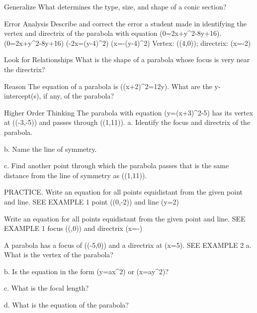 \documentclass{article}
\newenvironment{practice}[2]{}{}        %
\newcommand{\answer}[1]{}               %
\newcommand{\te}[1]{}                   %
\begin{document}
\begin{practice}{11}{2}
Generalize What determines the type, size, and shape of a conic section?
\answer{the way in which the plane intersects the double-right cone}
\end{practice}
\begin{practice}{12}{2}
Error Analysis Describe and correct the error a student made in identifying the vertex and directrix of the parabola with equation (0=2x+y^2-8y+16).
(0=2x+y^2-8y+16)
(-2x=(y-4)^2)
(x=-(y-4)^2)
Vertex: ((4,0)); directrix: (x=-2)
\te{The student's work is marked with a red X.}
\answer{The student wrote a correct equation, but interpreted it incorrectly. The vertex is ((0,4)), not ((4,0)), and since the parabola opens left and (c=-\frac{1}{2}), the directrix is (x=\frac{1}{2}), not (x=-2).}
\end{practice}
\begin{practice}{13}{2}
Look for Relationships What is the shape of a parabola whose focus is very near the directrix?
\answer{The parabola will appear very long and narrow.}
\end{practice}
\begin{practice}{14}{2}
Reason The equation of a parabola is ((x+2)^2=12y). What are the y-intercept(s), if any, of the parabola?
\answer{The y-intercept is ((0,\frac{1}{3})).}
\end{practice}
\begin{practice}{15}{3}
Higher Order Thinking The parabola with equation (y=(x+3)^2-5) has its vertex at ((-3,-5)) and passes through ((1,11)).
a. Identify the focus and directrix of the parabola.
\answer{focus: ((-3,-4.75)); directrix: (y=-5.25)}
b. Name the line of symmetry.
\answer{(x=-3)}
c. Find another point through which the parabola passes that is the same distance from the line of symmetry as ((1,11)).
\answer{((-7,11))}
\end{practice}
\begin{practice}{16}{1}
PRACTICE. Write an equation for all points equidistant from the given point and line. SEE EXAMPLE 1
point ((0,-2)) and line (y=2)
\answer{(y=-\frac{1}{8}x^2)}
\end{practice}
\begin{practice}{17}{1}
Write an equation for all points equidistant from the given point and line. SEE EXAMPLE 1
focus ((,0)) and directrix (x=-)
\answer{(x=y^2)}
\end{practice}
\begin{practice}{18}{1}
A parabola has a focus of ((-5,0)) and a directrix at (x=5). SEE EXAMPLE 2
a. What is the vertex of the parabola?
\answer{((0,0))}
b. Is the equation in the form (y=ax^2) or (x=ay^2)?
\answer{(x=ay^2)}
c. What is the focal length?
\answer{focal length (=5)}
d. What is the equation of the parabola?
\answer{(x=-\frac{1}{20}y^2)}
\end{practice}
\end{document}
